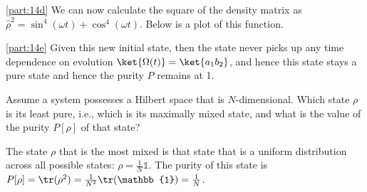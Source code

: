 \documentclass[boxes,pages]{homework}
\makeatletter
\numberwithin{@problem}{section}
\makeatother
\begin{document}
\begin{solution}
	\ref{part:14d}
	We can now calculate the square of the density matrix as $\hat{\rho}^2 = \sin^4(\omega t) + \cos^4(\omega t)$. Below is a plot of this function.
	\begin{figure}[h!]
		\centering
	\end{figure}

	\ref{part:14e}
	Given this new initial state, then the state never picks up any time dependence on evolution $\ket{\Omega(t)} = \ket{a_1b_2}$, and hence this state stays a pure state and hence the purity $P$ remains at 1.
\end{solution}

\begin{problem}
Assume a system possesses a Hilbert space that is $N$-dimensional. Which state $\rho$ is its least pure, i.e., which is its maximally mixed state, and what is the value of the purity $P[\rho]$ of that state?
\end{problem}

\begin{solution}
	The state $\rho$ that is the most mixed is that state that is a uniform distribution across all possible states: $\rho = \frac{1}{N}\mathbb{1}$. The purity of this state is $P[\rho] = \tr(\rho^2) = \frac{1}{N^2}\tr(\mathbb{1}) = \frac{1}{N}$.
\end{solution}
\end{document}
